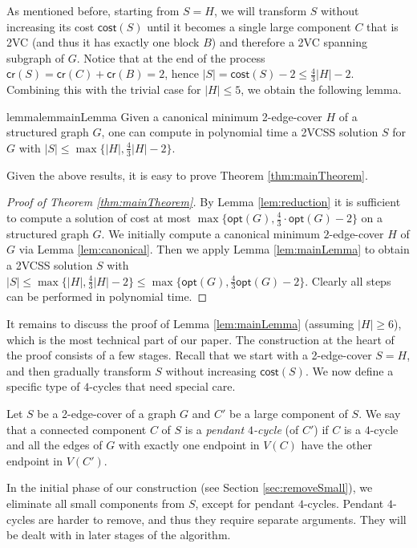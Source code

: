 \documentclass{article}
\newcommand{\opt}{\mathsf{opt}}
\newcommand{\cost}{\mathsf{cost}}
\newcommand{\credit}{\mathsf{cr}}
\begin{document}
As mentioned before, starting from $S=H$, we will transform $S$ without increasing its cost $\cost(S)$ until it becomes a single large component $C$ that is 2VC (and thus it has exactly one block $B$) and therefore a 2VC spanning subgraph of $G$. Notice that at the end of the process $\credit(S)=\credit(C)+\credit(B)=2$, hence $|S|= \cost(S)-2\leq \frac{4}{3}|H|-2$. Combining this with the trivial case for $|H|\leq 5$, we obtain the following lemma. 
\begin{restatable}{lemma}{lemmainLemma}\label{lem:mainLemma}
Given a canonical minimum 2-edge-cover $H$ of a structured graph $G$, one can compute in polynomial time a 2VCSS solution $S$ for $G$ with $|S|\leq \max\{|H|,\frac{4}{3}|H| - 2\}$.
\end{restatable}

Given the above results, it is easy to prove Theorem \ref{thm:mainTheorem}.
\begin{proof}[Proof of Theorem \ref{thm:mainTheorem}]
By Lemma \ref{lem:reduction} it is sufficient to compute a solution of cost at most $\max\{\opt(G),\frac{4}{3}\cdot\opt(G) - 2\}$ on a structured graph $G$. We initially compute a canonical minimum $2$-edge-cover $H$ of $G$ via Lemma \ref{lem:canonical}.
Then we apply Lemma \ref{lem:mainLemma} to obtain a 2VCSS solution $S$ with $|S|\leq \max\{|H|,\frac{4}{3}|H|-2\}\leq \max\{\opt(G),\frac{4}{3}\opt(G)-2\}$. Clearly all steps can be performed in polynomial time. 
\end{proof}


It remains to discuss the proof of Lemma \ref{lem:mainLemma} (assuming $|H|\geq 6$), which is the most technical part of our paper. The construction at the heart of the proof consists of a few stages. Recall that we start with a 2-edge-cover $S=H$, and then gradually transform $S$ without increasing $\cost(S)$. We now define a specific type of $4$-cycles that need special care.

\begin{definition}
    Let $S$ be a 2-edge-cover of a graph $G$ and $C'$ be a large component of $S$. We say that a connected component $C$ of $S$ is a \emph{pendant $4$-cycle} (of $C'$) if $C$ is a $4$-cycle and all the edges of $G$ with exactly one endpoint in $V(C)$ have the other endpoint in $V(C')$.
\end{definition}

In the initial phase of our construction (see Section \ref{sec:removeSmall}), we eliminate all small components from $S$, except for pendant $4$-cycles. Pendant $4$-cycles are harder to remove, and thus they require separate arguments. They will be dealt with in later stages of the algorithm.
\end{document}
